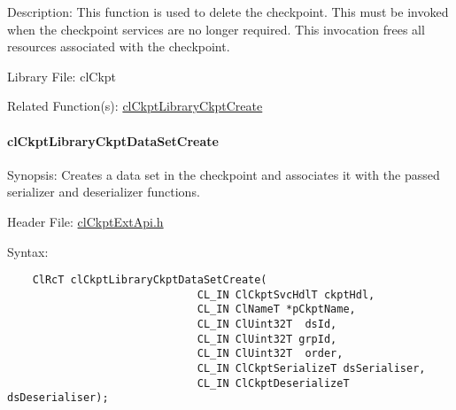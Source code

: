 \begin{Desc}
\item[Description:]This function is used to delete the checkpoint. This must be invoked when the checkpoint services are no longer required. This invocation frees all resources associated with the checkpoint.\end{Desc}
\begin{Desc}
\item[Library File:]cl\-Ckpt\end{Desc}
\begin{Desc}
\item[Related Function(s):]\hyperlink{group__group10}{cl\-Ckpt\-Library\-Ckpt\-Create} \end{Desc}
\hypertarget{pageckpt205}{}\paragraph{cl\-Ckpt\-Library\-Ckpt\-Data\-Set\-Create}\label{pageckpt205}
\begin{Desc}
\item[Synopsis:]Creates a data set in the checkpoint and associates it with the passed serializer and deserializer functions.\end{Desc}
\begin{Desc}
\item[Header File:]\hyperlink{cl_ckpt_ext_api_8h}{cl\-Ckpt\-Ext\-Api.h}\end{Desc}
\begin{Desc}
\item[Syntax:]

\footnotesize\begin{verbatim}    ClRcT clCkptLibraryCkptDataSetCreate(
                              CL_IN ClCkptSvcHdlT ckptHdl,
                              CL_IN ClNameT *pCkptName,
                              CL_IN ClUint32T  dsId,
                              CL_IN ClUint32T grpId,
                              CL_IN ClUint32T  order,
                              CL_IN ClCkptSerializeT dsSerialiser,
                              CL_IN ClCkptDeserializeT dsDeserialiser);
\end{verbatim}
\normalsize
\end{Desc}
